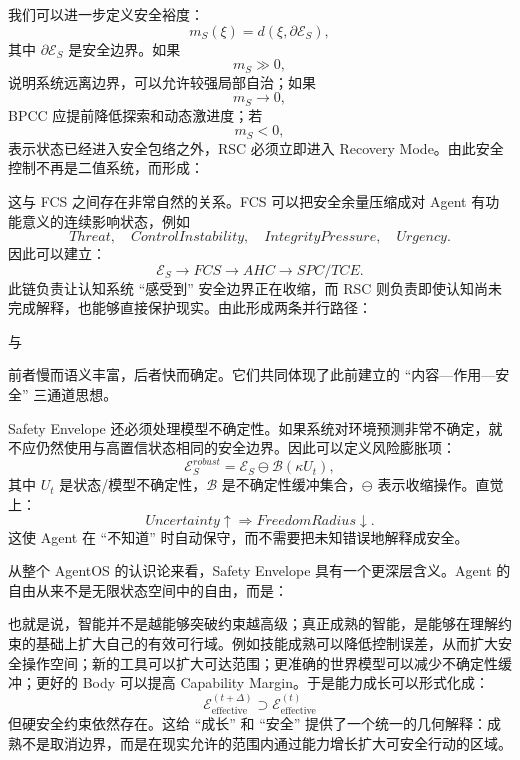 我们可以进一步定义安全裕度：
\[
m_S(\xi)
=
d(
\xi,
\partial\mathcal E_S
),
\]
其中 $\partial\mathcal E_S$ 是安全边界。如果
\[
m_S\gg0,
\]
说明系统远离边界，可以允许较强局部自治；如果
\[
m_S\rightarrow0,
\]
BPCC 应提前降低探索和动态激进度；若
\[
m_S<0,
\]
表示状态已经进入安全包络之外，RSC 必须立即进入 Recovery Mode。由此安全控制不再是二值系统，而形成：
\begin{statementbox}
\centering
{}
\end{statementbox}

这与 FCS 之间存在非常自然的关系。FCS 可以把安全余量压缩成对 Agent 有功能意义的连续影响状态，例如
\[
Threat,
\quad
ControlInstability,
\quad
IntegrityPressure,
\quad
Urgency.
\]
因此可以建立：
\[
\mathcal E_S
\rightarrow
FCS
\rightarrow
AHC
\rightarrow
SPC/TCE.
\]
此链负责让认知系统 ``感受到'' 安全边界正在收缩，而 RSC 则负责即使认知尚未完成解释，也能够直接保护现实。由此形成两条并行路径：
\begin{statementbox}
\centering
{}
\end{statementbox}
与
\begin{statementbox}
\centering
{}
\end{statementbox}
前者慢而语义丰富，后者快而确定。它们共同体现了此前建立的 ``内容—作用—安全'' 三通道思想。

Safety Envelope 还必须处理模型不确定性。如果系统对环境预测非常不确定，就不应仍然使用与高置信状态相同的安全边界。因此可以定义风险膨胀项：
\[
\mathcal E_S^{robust}
=
\mathcal E_S
\ominus
\mathcal B(
\kappa U_t
),
\]
其中 $U_t$ 是状态/模型不确定性，$\mathcal B$ 是不确定性缓冲集合，$\ominus$ 表示收缩操作。直觉上：
\[
Uncertainty\uparrow
\Rightarrow
FreedomRadius\downarrow.
\]
这使 Agent 在 ``不知道'' 时自动保守，而不需要把未知错误地解释成安全。

从整个 AgentOS 的认识论来看，Safety Envelope 具有一个更深层含义。Agent 的自由从来不是无限状态空间中的自由，而是：
\begin{statementbox}
\centering
{}
\end{statementbox}
也就是说，智能并不是越能够突破约束越高级；真正成熟的智能，是能够在理解约束的基础上扩大自己的有效可行域。例如技能成熟可以降低控制误差，从而扩大安全操作空间；新的工具可以扩大可达范围；更准确的世界模型可以减少不确定性缓冲；更好的 Body 可以提高 Capability Margin。于是能力成长可以形式化成：
\[
\mathcal E_{\mathrm{effective}}^{(t+\Delta)}
\supset
\mathcal E_{\mathrm{effective}}^{(t)}
\]
但硬安全约束依然存在。这给 ``成长'' 和 ``安全'' 提供了一个统一的几何解释：成熟不是取消边界，而是在现实允许的范围内通过能力增长扩大可安全行动的区域。


